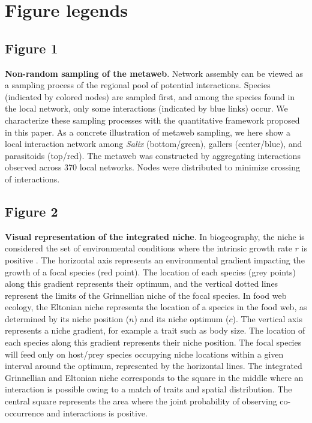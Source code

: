 \documentclass[12pt]{article}
\begin{document}
\section*{Figure legends}

\subsection*{Figure 1}

\textbf{Non-random sampling of the metaweb}. Network assembly can be viewed
as a sampling process of the regional pool of potential interactions. Species
(indicated by colored nodes) are sampled first, and among the species found in
the local network, only some interactions (indicated by blue links) occur.
We characterize these sampling processes with the quantitative framework
proposed in this paper. As a concrete illustration of metaweb sampling, we
here show a local interaction network among \textit{Salix} (bottom/green), gallers
(center/blue), and parasitoids (top/red). The metaweb was constructed by
aggregating interactions observed across 370 local networks. Nodes were distributed
to minimize crossing of interactions.

\subsection*{Figure 2}

\textbf{Visual representation of the integrated niche}. In biogeography, the
niche is considered the set of environmental conditions where the intrinsic
growth rate $r$ is positive \citep{Holt2009a}. The horizontal axis represents
an environmental gradient impacting the growth of a focal species (red point).
The location of each species (grey points) along this gradient represents their
optimum, and the vertical dotted lines represent the limits of the Grinnellian
niche of the focal species. In food web ecology, the Eltonian niche represents
the location of a species in the food web, as determined by its niche position
($n$) and its niche optimum ($c$). The vertical axis represents a niche
gradient, for example a trait such as body size. The location of each species
along this gradient represents their niche position. The focal species will
feed only on host/prey species occupying niche locations within a given interval
around the optimum, represented by the horizontal lines. The integrated
Grinnellian and Eltonian niche corresponds to the square in the middle where
an interaction is possible owing to a match of traits and spatial
distribution. The central square represents the area where the joint
probability of observing co-occurrence and interactions is positive.
\end{document}
